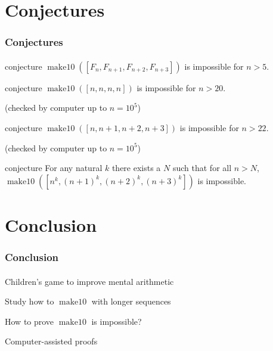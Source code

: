 \documentclass{beamer}                             %
\DeclareMathOperator{\maketen}{make10}
\newenvironment{wideitemize}
  {\itemize\setlength{\itemsep}{0.5cm}}
  {\enditemize}
\begin{document}
\section{Conjectures}

\begin{frame}
\frametitle{Conjectures}
\framesubtitle{}

\begin{block}{conjecture}
  \( \maketen([F_{n}, F_{n + 1}, F_{n + 2},
  F_{n + 3}]) \) is impossible for \( n > 5 \).
\end{block}

\begin{block}{conjecture}
  \( \maketen([n, n, n, n]) \) is impossible for \( n > 20 \).

  (checked by computer up to \( n = 10^5 \))
\end{block}

\begin{block}{conjecture}
  \( \maketen([n, n + 1, n + 2, n + 3]) \) is impossible for \( n > 22 \).

  (checked by computer up to \( n = 10^5 \))
\end{block}

\begin{block}{conjecture}
  For any natural \( k \) there exists a \( N \) such that for all \( n > N
  \), \( \maketen([n^k, (n + 1)^k, (n + 2)^k, (n + 3)^k]) \) is impossible.
\end{block}
\end{frame}

\section{Conclusion}

\begin{frame}
\frametitle{Conclusion}
\framesubtitle{}

\begin{wideitemize}
  \item Children's game to improve mental arithmetic
  \item Study how to \( \maketen \) with longer sequences
  \item How to prove \( \maketen \) is impossible?
  \item Computer-assisted proofs
\end{wideitemize}
\end{frame}
\end{document}
